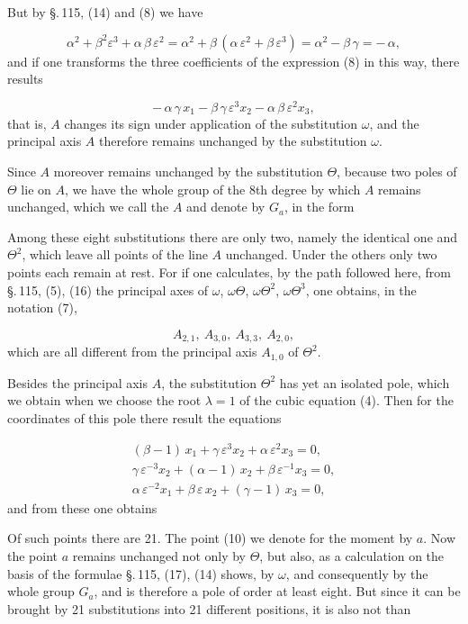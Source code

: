 But by \S.\,115, (14) and (8) we have

\[
\alpha^2 + \beta^2\varepsilon^3 + \alpha\,\beta\,\varepsilon^2 = \alpha^2 + \beta\,(\alpha\,\varepsilon^2 + \beta\,\varepsilon^3) = \alpha^2 - \beta\,\gamma = -\,\alpha,
\]
and if one transforms the three coefficients of the expression (8) in this way, there results

\[
-\,\alpha\,\gamma\,x_1 - \beta\,\gamma\,\varepsilon^3 x_2 - \alpha\,\beta\,\varepsilon^2 x_3,
\]
that is, $A$ changes its sign under application of the substitution $\omega$, and the principal axis $A$ therefore remains unchanged by the substitution $\omega$.

Since $A$ moreover remains unchanged by the substitution $\Theta$, because two poles of $\Theta$ lie on $A$, we have the whole group of the 8th degree by which $A$ remains unchanged, which we call the  $A$ and denote by $G_a$, in the form

Among these eight substitutions there are only two, namely the identical one and $\Theta^2$, which leave all points of the line $A$ unchanged. Under the others only two points each remain at rest. For if one calculates, by the path followed here, from \S.\,115, (5), (16) the principal axes of $\omega$, $\omega\Theta$, $\omega\Theta^2$, $\omega\Theta^3$, one obtains, in the notation (7),

\[
A_{2,1},\ A_{3,0},\ A_{3,3},\ A_{2,0},
\]
which are all different from the principal axis $A_{1,0}$ of $\Theta^2$.

Besides the principal axis $A$, the substitution $\Theta^2$ has yet an isolated pole, which we obtain when we choose the root $\lambda = 1$ of the cubic equation (4). Then for the coordinates of this pole there result the equations

\[
\begin{array}{l}
(\beta-1)\,x_1 + \gamma\,\varepsilon^3 x_2 + \alpha\,\varepsilon^2 x_3 = 0,\\
\gamma\,\varepsilon^{-3} x_2 + (\alpha-1)\,x_2 + \beta\,\varepsilon^{-1} x_3 = 0,\\ %
\alpha\,\varepsilon^{-2} x_1 + \beta\,\varepsilon\, x_2 + (\gamma-1)\,x_3 = 0,
\end{array}
\]
and from these one obtains

Of such points there are 21. The point (10) we denote for the moment by $a$. Now the point $a$ remains unchanged not only by $\Theta$, but also, as a calculation on the basis of the formulae \S.\,115, (17), (14) shows, by $\omega$, and consequently by the whole group $G_a$, and is therefore a pole of order at least eight. But since it can be brought by 21 substitutions into 21 different positions, it is also not  than
